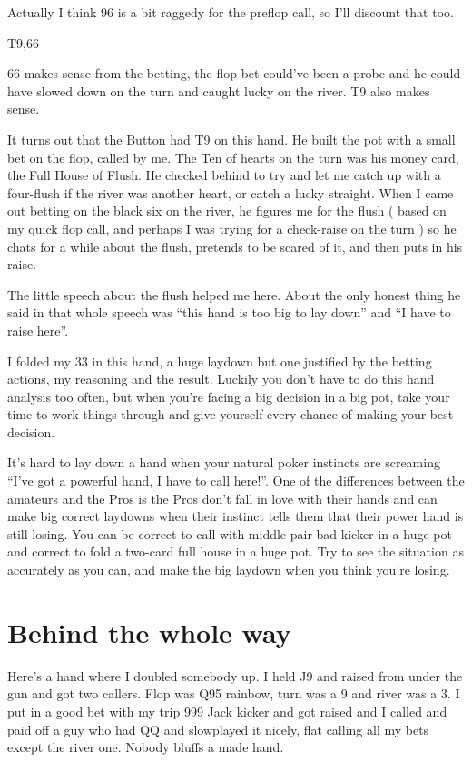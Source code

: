 Actually I think 96 is a bit raggedy for the preflop call, so I'll
discount that too.

T9,66

66 makes sense from the betting, the flop bet could've been a probe
and he could have slowed down on the turn and caught lucky on the river.
T9 also makes sense.

It turns out that the Button had T9 on this hand.
He built the pot with a small bet on the flop, called by me.
The Ten of hearts on the turn was his money card, the
Full House of Flush. He checked behind
to try and let me catch up with a four-flush if the river was
another heart, or catch a lucky straight.
When I came out betting on the black six on
the river, he figures me for the flush ( based on my quick
flop call, and perhaps I was trying for a check-raise on the turn )
so he chats for a while about the flush, pretends to be scared of it,
and then puts in his raise.

The little speech about the flush helped me here. About
the only honest thing he said in that whole speech was
``this hand is too big to lay down'' and ``I have to raise here''.

I folded my 33 in this hand, a huge laydown but one
justified by the betting actions, my reasoning and the result.
Luckily you don't have to do this hand analysis too often, but
when you're facing a big decision in a big pot, take your time to
work things through and give yourself every chance of making your best
decision.

It's hard to lay down a hand when your natural poker instincts are
screaming ``I've got a powerful hand, I have to call here!''. One of
the differences between the amateurs and the Pros is the Pros don't
fall in love with their hands and can make big correct laydowns when
their instinct tells them that their power hand is still losing.
You can be correct to call with middle pair bad kicker in a huge pot
and correct to fold a two-card full house in a huge pot. Try to see
the situation as accurately as you can, and make the big laydown when
you think you're losing.

\section{Behind the whole way}

Here's a hand where I doubled somebody up. I held J9 and raised from
under the gun and got two callers. Flop was
Q95 rainbow, turn was a 9 and river was a 3. I put in a good bet
with my trip 999 Jack kicker and got raised and I called and paid off
a guy who had QQ and slowplayed it nicely, flat calling all my bets
except the river one. Nobody bluffs a made hand.

